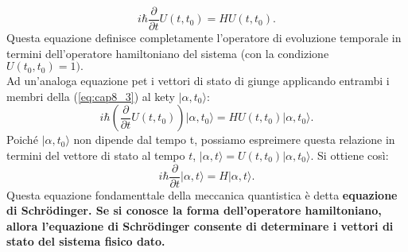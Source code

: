 \begin{equation}
i\hbar \frac{\partial}{\partial t} U (t, t_0)= H U(t,t_0).
\label{eq:cap8_3}
\end{equation}
Questa equazione definisce completamente l'operatore di evoluzione temporale in termini dell'operatore hamiltoniano del sistema (con la condizione $U(t_0,t_0)=1).$\\
Ad un'analoga equazione pet i vettori di stato di giunge applicando entrambi i membri della (\ref{eq:cap8_3}) al kety $\vert \alpha, t_0\rangle$:
\begin{equation}
i\hbar \left( \frac{\partial}{\partial t} U (t,t_0) \right) \vert \alpha, t_0\rangle= H U(t, t_0)\vert \alpha, t_0\rangle.
\end{equation}
Poiché $\vert \alpha, t_0\rangle$ non dipende dal tempo t, possiamo espreimere questa relazione in termini del vettore di stato al tempo $t$, $\vert \alpha, t\rangle= U(t,t_0)\vert \alpha, t_0\rangle$. Si ottiene così:
\begin{equation}
i\hbar \frac{\partial}{\partial t} \vert \alpha, t \rangle = H \vert \alpha, t \rangle.
\end{equation}
Questa equazione fondamenttale della meccanica quantistica è detta \textbf{equazione di Schr\"{o}dinger. Se si conosce la forma dell'operatore hamiltoniano, allora l'equazione di Schr\"{o}dinger consente di determinare i vettori di stato del sistema fisico dato.}
